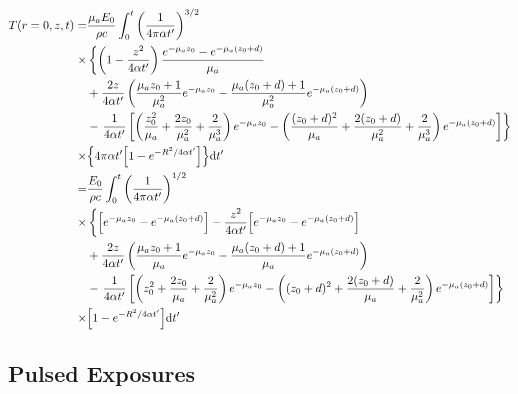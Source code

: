 \documentclass[]{article}
\begin{document}
\begin{align}
  T(r=0, z,t) =& \frac{\mu_a E_0}{\rho c} \int_0^t \qty(\frac{1}{4\pi \alpha t'})^{3/2}  \\
  \times & \left\{\left(1 -  \frac{z^2}{4\alpha t'}\right)\frac{e^{-\mu_a z_0} - e^{-\mu_a (z_0+d)}}{\mu_a} \right.\\
    &+ \frac{2z}{4\alpha t'} \left( \frac{\mu_a z_0 + 1}{\mu_a^2}e^{-\mu_a z_0} - \frac{\mu_a (z_0+d) + 1}{\mu_a^2}e^{-\mu_a (z_0+d)}\right) \\
    &- \left.\frac{1}{4\alpha t'}\left[
   \left( \frac{z_0^2}{\mu_a} + \frac{2z_0}{\mu_a^2} + \frac{2}{\mu_a^3} \right)e^{-\mu_a z_0} -
   \left( \frac{(z_0 + d)^2}{\mu_a} + \frac{2(z_0 + d)}{\mu_a^2} + \frac{2}{\mu_a^3} \right)e^{-\mu_a (z_0+d)}
 \right]
\right\} \\
  \times & \qty{4\pi \alpha t' \qty[1 - e^{-R^2/4\alpha t'}] }
  \dd t' \\
  =&
  \frac{E_0}{\rho c} \int_0^t \qty(\frac{1}{4\pi \alpha t'})^{1/2}  \\
  \times & \left\{\qty[e^{-\mu_a z_0} - e^{-\mu_a (z_0+d)}]   -  \frac{z^2}{4\alpha t'}\qty[e^{-\mu_a z_0} - e^{-\mu_a (z_0+d)}]\right.\\
    &+ \frac{2z}{4\alpha t'} \left( \frac{\mu_a z_0 + 1}{\mu_a}e^{-\mu_a z_0} - \frac{\mu_a (z_0+d) + 1}{\mu_a}e^{-\mu_a (z_0+d)}\right) \\
    &- \left.\frac{1}{4\alpha t'}\left[
   \left( z_0^2       + \frac{2z_0}{\mu_a} + \frac{2}{\mu_a^2} \right)e^{-\mu_a z_0} -
   \left( (z_0 + d)^2 + \frac{2(z_0 + d)}{\mu_a} + \frac{2}{\mu_a^2} \right)e^{-\mu_a (z_0+d)}
 \right]
\right\} \\
  \times & \qty[1 - e^{-R^2/4\alpha t'}]
  \dd t' \\
\end{align}



\subsection{Pulsed Exposures}
\end{document}
